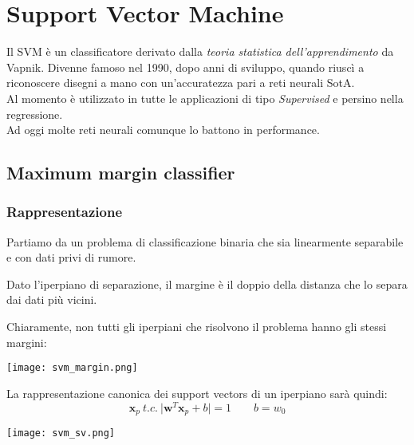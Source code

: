 \newpage
\section{Support Vector Machine}
Il SVM è un classificatore derivato dalla \textit{teoria statistica dell'apprendimento} da Vapnik. Divenne famoso nel 1990, dopo anni di sviluppo, quando riuscì a riconoscere disegni a mano con un'accuratezza pari a reti neurali SotA.\\
Al momento è utilizzato in tutte le applicazioni di tipo \textit{Supervised} e persino nella regressione.\\
Ad oggi molte reti neurali comunque lo battono in performance.
\subsection{Maximum margin classifier}
\subsubsection{Rappresentazione}
Partiamo da un problema di classificazione binaria che sia linearmente separabile e con dati privi di rumore.
\begin{definition}[Margine]
	Dato l'iperpiano di separazione, il margine è il doppio della distanza che lo separa dai dati più vicini.
\end{definition}
Chiaramente, non tutti gli iperpiani che risolvono il problema hanno gli stessi margini:
\begin{center}
	\texttt{[image: svm\_margin.png]}
\end{center}
La rappresentazione canonica dei support vectors di un iperpiano sarà quindi:
\begin{equation}
	\mathbf{x}_p \: t.c. \: \lvert \mathbf{w}^T \mathbf{x}_p + b \rvert = 1 \quad\quad b=w_0
\end{equation}
\begin{center}
	\texttt{[image: svm\_sv.png]}
\end{center}
